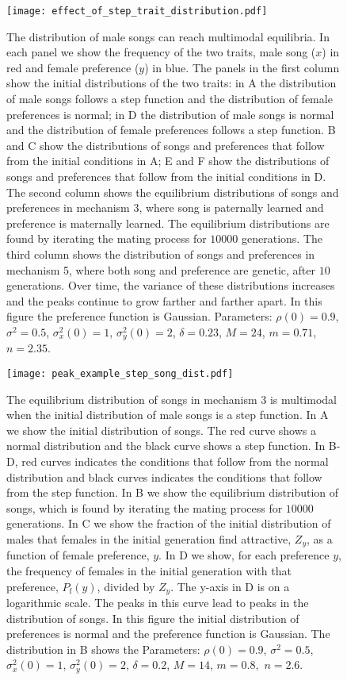 \documentclass[12pt]{article}
\newcommand{\x}[1]{\text{#1}}
\begin{document}
\begin{figure}
\texttt{[image: effect\_of\_step\_trait\_distribution.pdf]}
\caption{\label{mechs3and5} The distribution of male songs can reach multimodal equilibria. In each panel we show the frequency of the two traits, male song ($x$) in red and female preference ($y$) in blue. The panels in the first column show the initial distributions of the two traits: in A the distribution of male songs follows a step function and the distribution of female preferences is normal; in D the distribution of male songs is normal and the distribution of female preferences follows a step function. B and C show the distributions of songs and preferences that follow from the initial conditions in A; E and F show the distributions of songs and preferences that follow from the initial conditions in D. The second column shows the equilibrium distributions of songs and preferences in mechanism 3, where song is paternally learned and preference is maternally learned. The equilibrium distributions are found by iterating the mating process for $10000$ generations. The third column shows the distribution of songs and preferences in mechanism 5, where both song and preference are genetic, after $10$ generations. Over time, the variance of these distributions increases and the peaks continue to grow farther and farther apart. In this figure the preference function is Gaussian. Parameters: $\rho(0)=0.9$, $\sigma^2=0.5$, $\sigma_x^2(0)=1$, $\sigma_y^2(0)=2$, $\delta=0.23$, $M=24$, $m=0.71$,  $n=2.35$.}
\end{figure}

\begin{figure}
\texttt{[image: peak\_example\_step\_song\_dist.pdf]}
\caption{\label{peak_example_song}  The equilibrium distribution of songs in mechanism 3 is multimodal when the initial distribution of male songs is a step function. In A we show the initial distribution of songs. The red curve shows a normal distribution and the black curve shows a step function. In B-D, red curves indicates the conditions that follow from the normal distribution and black curves indicates the conditions that follow from the step function. In B we show the equilibrium distribution of songs, which is found by iterating the mating process for $10000$ generations. In C we show the fraction of the initial distribution of males that females in the initial generation find attractive, $Z_y$, as a function of female preference, $y$. In D we show, for each preference $y$, the frequency of females in the initial generation with that preference, $P_\x{f}(y)$, divided by $Z_y$. The y-axis in D is on a logarithmic scale. The peaks in this curve lead to peaks in the distribution of songs.  In this figure the initial distribution of preferences is normal and the preference function is Gaussian. The distribution in B shows the Parameters: $\rho(0)=0.9$, $\sigma^2=0.5$,  $\sigma_x^2(0)=1$, $\sigma_y^2(0)=2$,  $\delta=0.2$, $M=14$, $m=0.8,$ $n=2.6$. 
}
\end{figure}
\end{document}
